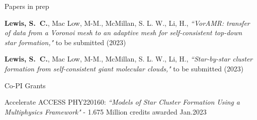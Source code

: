 \documentclass{resume} %
\begin{document}

\begin{rSection}{Papers in prep}
\begin{etaremune}

\item \textbf{{Lewis}, S.~C.}, {Mac Low}, M-M., {McMillan}, S. L. W., Li, H., \textit{``VorAMR: transfer of data from a Voronoi mesh to an adaptive mesh for self-consistent top-down star formation,"} to be submitted (2023)

\item \textbf{{Lewis}, S.~C.}, {Mac Low}, M-M., {McMillan}, S. L. W., Li, H., \textit{``Star-by-star cluster formation from self-consistent giant molecular clouds,"} to be submitted (2023)

\end{etaremune}
\end{rSection}

\begin{rSection}{Co-PI Grants}
\begin{etaremune}
\item Accelerate ACCESS PHY220160: \textit{``Models of Star Cluster Formation Using a Multiphysics Framework"} - 1.675 Million credits awarded \hfill Jan.2023
\end{etaremune}
\end{rSection}

\end{document}
